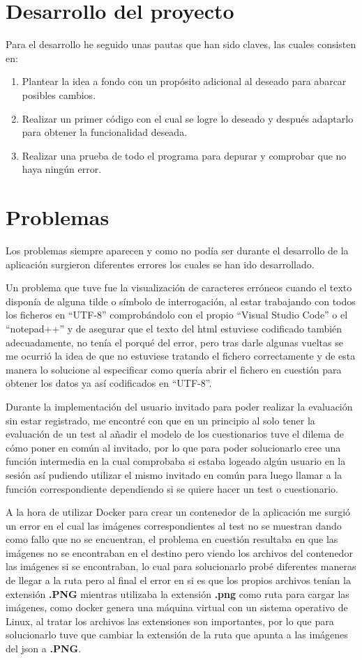 \section{Desarrollo del proyecto}
Para el desarrollo he seguido unas pautas que han sido claves, las cuales consisten en:
\begin{enumerate}
    \item Plantear la idea a fondo con un propósito adicional al deseado para abarcar posibles cambios.
    \item Realizar un primer código con el cual se logre lo deseado y después adaptarlo para obtener la funcionalidad deseada.
    \item Realizar una prueba de todo el programa para depurar y comprobar que no haya ningún error.
\end{enumerate}

\section{Problemas}
Los problemas  siempre aparecen y como no podía ser durante el desarrollo de la aplicación surgieron diferentes errores los cuales se han ido desarrollado. 

Un problema que tuve fue la visualización de caracteres erróneos cuando el texto disponía de alguna tilde o símbolo de interrogación, al estar trabajando con todos los ficheros en “UTF-8” comprobándolo con el propio “Visual Studio Code” o el “notepad++” y de asegurar que el texto del html estuviese codificado también adecuadamente,  no tenía el porqué del error, pero tras darle algunas vueltas se me ocurrió la idea de que no estuviese tratando el fichero correctamente y de esta manera lo solucione al especificar como quería abrir el fichero en cuestión para obtener los datos ya así codificados en “UTF-8”. 

Durante la implementación del usuario invitado para poder realizar la evaluación sin estar registrado, me encontré con que en un principio al solo tener la evaluación de un test al añadir el modelo de los cuestionarios tuve el dilema de cómo poner en común al invitado, por lo que para poder solucionarlo cree una función intermedia en la cual comprobaba si estaba logeado algún usuario en la sesión así pudiendo  utilizar el mismo invitado en común para luego llamar a la función correspondiente dependiendo si se quiere hacer un test o cuestionario. 

A la hora de utilizar Docker para crear un contenedor de la aplicación me surgió un error en el cual  las imágenes correspondientes al test no se muestran dando como fallo que no se encuentran, el problema en cuestión resultaba en que las imágenes no se encontraban en el destino pero viendo los archivos del contenedor las imágenes si se encontraban, lo cual para solucionarlo probé diferentes maneras de llegar a la ruta pero al final el error en si es que los propios archivos tenían la extensión  \textbf{.PNG} mientras utilizaba la extensión \textbf{.png} como ruta para cargar las imágenes, como docker genera una máquina virtual con un sistema operativo de Linux, al tratar los archivos las extensiones son importantes, por lo que para solucionarlo tuve que cambiar la extensión de la ruta que apunta a las imágenes del json a \textbf{.PNG}.